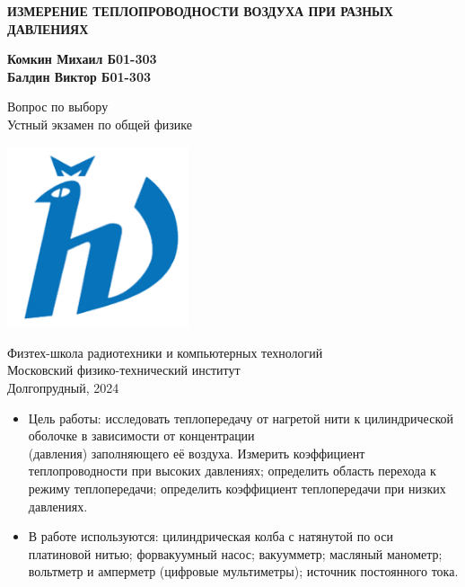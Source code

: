\documentclass[12pt]{article}
\begin{document}
    \begin{titlepage}
        \begin{center}
            \vspace*{1cm}

            \Huge
            \textbf{ИЗМЕРЕНИЕ ТЕПЛОПРОВОДНОСТИ ВОЗДУХА ПРИ РАЗНЫХ ДАВЛЕНИЯХ}

            \vspace{1.5cm}

            \Large
            \textbf{Комкин Михаил Б01-303\\
                    Балдин Виктор Б01-303}

            \vfill

            Вопрос по выбору \\
            Устный экзамен по общей физике

            \vspace{0.8cm}

            \includegraphics[width=0.4\textwidth]{university_logo.png}

            Физтех-школа радиотехники и компьютерных технологий\\
            Московский физико-технический институт\\
            Долгопрудный, 2024
        \end{center}
    \end{titlepage}

    \begin{itemize}
        \item{Цель работы:} исследовать теплопередачу от нагретой нити к цилиндрической оболочке в зависимости от концентрации\\
        (давления) заполняющего её воздуха. Измерить коэффициент теплопроводности при высоких давлениях; определить область перехода к
        режиму теплопередачи; определить коэффициент теплопередачи при низких давлениях.\\
        \item{В работе используются:} цилиндрическая колба с натянутой по оси платиновой нитью; форвакуумный насос; вакуумметр; масляный манометр; вольтметр и амперметр
        (цифровые мультиметры); источник постоянного тока.
    \end{itemize}
\end{document}
